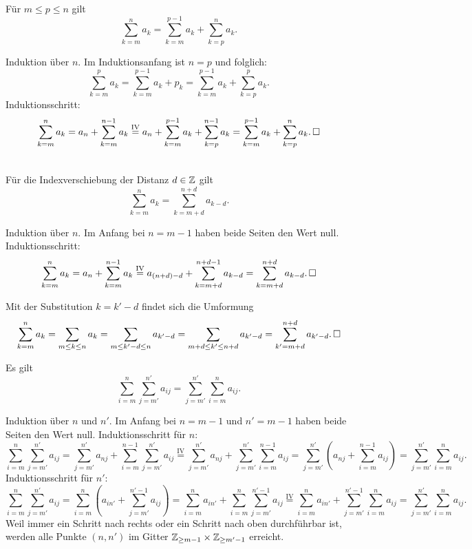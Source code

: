 \begin{Korollar}\label{sum-split}
Für $m\le p\le n$ gilt
\[\sum_{k=m}^n a_k = \sum_{k=m}^{p-1} a_k + \sum_{k=p}^n a_k.\]
\end{Korollar}
\begin{Beweis} Induktion über $n$. Im Induktionsanfang ist $n=p$
und folglich:
\[\sum_{k=m}^p a_k = \sum_{k=m}^{p-1} a_k + p_k
= \sum_{k=m}^{p-1} a_k + \sum_{k=p}^p a_k.\]
Induktionsschritt:
\[\sum_{k=m}^n a_k = a_n + \sum_{k=m}^{n-1} a_k
\stackrel{\mathrm{IV}}= a_n + \sum_{k=m}^{p-1} a_k + \sum_{k=p}^{n-1} a_k
= \sum_{k=m}^{p-1} a_k + \sum_{k=p}^n a_k.\,\square
\]
\end{Beweis}

\begin{Korollar}[Indexshift]\label{sum-indexshift}\mbox{}\\
Für die Indexverschiebung der Distanz $d\in\mathbb Z$ gilt
\[\textstyle\sum_{k=m}^n a_k = \sum_{k=m+d}^{n+d} a_{k-d}.\]
\end{Korollar}
\begin{Beweis}[Beweis 1]
Induktion über $n$. Im Anfang bei $n = m-1$ haben beide Seiten
den Wert null. Induktionsschritt:
\[\sum_{k=m}^n a_k = a_n+\sum_{k=m}^{n-1}a_k \stackrel{\mathrm{IV}}=
a_{(n+d)-d}+\sum_{k=m+d}^{n+d-1}a_{k-d}
= \sum_{k=m+d}^{n+d}a_{k-d}.\,\square\]
\end{Beweis}
\begin{Beweis}[Beweis 2]
Mit der Substitution $k=k'-d$ findet sich die Umformung
\[\sum_{k=m}^n a_k = \sum_{m\le k\le n} a_k
= \sum_{m\le k'-d\le n} a_{k'-d}
= \sum_{m+d\le k'\le n+d} a_{k'-d}
= \sum_{k'=m+d}^{n+d} a_{k'-d}.\,\square\]
\end{Beweis}

\begin{Korollar} Es gilt
\[\sum_{i=m}^n \sum_{j=m'}^{n'} a_{ij} = \sum_{j=m'}^{n'}\sum_{i=m}^n a_{ij}.\]
\end{Korollar}
\begin{Beweis}
Induktion über $n$ und $n'$. Im Anfang bei $n=m-1$ und $n'=m-1$
haben beide Seiten den Wert null. Induktionsschritt für $n$:
\[\sum_{i=m}^n\sum_{j=m'}^{n'} a_{ij}
= \!\!\sum_{j=m'}^{n'} a_{nj}
+ \!\sum_{i=m}^{n-1}\sum_{j=m'}^{n'} a_{ij}
\stackrel{\mathrm{IV}}=
\!\sum_{j=m'}^{n'} a_{nj}
+ \!\sum_{j=m'}^{n'}\sum_{i=m}^{n-1} a_{ij}
= \!\!\sum_{j=m'}^{n'} (a_{nj}+\sum_{i=m}^{n-1} a_{ij})
= \!\!\sum_{j=m'}^{n'} \sum_{i=m}^n a_{ij}.\]
Induktionsschritt für $n'$:
\[\sum_{i=m}^n\sum_{j=m'}^{n'} a_{ij}
= \!\!\sum_{i=m}^n (a_{in'}+\!\!\sum_{j=m'}^{n'-1}a_{ij})
= \!\!\sum_{i=m}^n a_{in'}+\!\!\sum_{i=m}^n\sum_{j=m'}^{n'-1}a_{ij}
\stackrel{\mathrm{IV}}=
\!\sum_{i=m}^n a_{in'}+\sum_{j=m'}^{n'-1}\sum_{i=m}^n a_{ij}
= \!\!\sum_{j=m'}^{n'}\sum_{i=m}^n a_{ij}.\]
Weil immer ein Schritt nach rechts oder ein Schritt nach oben durchführbar ist,
werden alle Punkte $(n,n')$ im Gitter $\mathbb Z_{\ge m-1}\times\mathbb Z_{\ge m'-1}$ erreicht.\,\qedsymbol
\end{Beweis}

